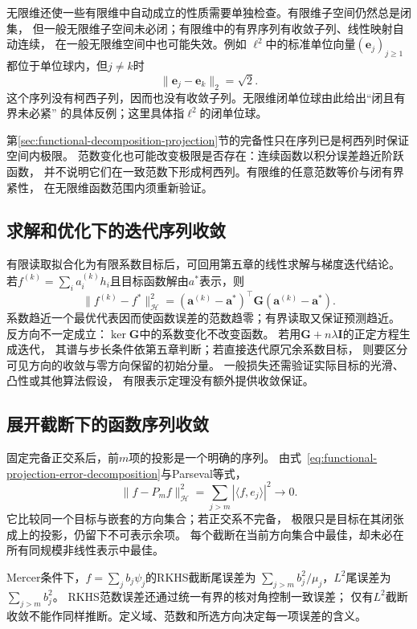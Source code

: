 无限维还使一些有限维中自动成立的性质需要单独检查。有限维子空间仍然总是闭集，
但一般无限维子空间未必闭；有限维中的有界序列有收敛子列、线性映射自动连续，
在一般无限维空间中也可能失效。例如
$\ell^2$中的标准单位向量$(\bm{e}_j)_{j\geq1}$都位于单位球内，但$j\neq k$时
\[
  \lVert\bm{e}_j-\bm{e}_k\rVert_2=\sqrt{2}.
\]
这个序列没有柯西子列，因而也没有收敛子列。无限维闭单位球由此给出“闭且有界未必紧”
的具体反例；这里具体指$\ell^2$的闭单位球。


第\ref{sec:functional-decomposition-projection}节的完备性只在序列已是柯西列时保证空间内极限。
范数变化也可能改变极限是否存在：连续函数以积分误差趋近阶跃函数，
并不说明它们在一致范数下形成柯西列。有限维的任意范数等价与闭有界紧性，
在无限维函数范围内须重新验证。

\subsection{求解和优化下的迭代序列收敛}
\label{sec:functional-iteration-convergence}

有限读取拟合化为有限系数目标后，可回用第五章的线性求解与梯度迭代结论。
若$f^{(k)}=\sum_i a_i^{(k)}h_i$且目标函数解由$a^*$表示，则
\[
 \lVert f^{(k)}-f^*\rVert_{\mathcal H}^2
 =(\bm a^{(k)}-\bm a^*)^\top\bm G(\bm a^{(k)}-\bm a^*).
\]
系数趋近一个最优代表因而使函数误差的范数趋零；有界读取又保证预测趋近。
反方向不一定成立：$\ker\bm G$中的系数变化不改变函数。
若用$\bm G+n\lambda\bm I$的正定方程生成迭代，
其谱与步长条件依第五章判断；若直接迭代原冗余系数目标，
则要区分可见方向的收敛与零方向保留的初始分量。
一般损失还需验证实际目标的光滑、凸性或其他算法假设，
有限表示定理没有额外提供收敛保证。

\subsection{展开截断下的函数序列收敛}
\label{sec:functional-truncation-convergence}

固定完备正交系后，前$m$项的投影是一个明确的序列。
由式~\eqref{eq:functional-projection-error-decomposition}与Parseval等式，
\[
 \lVert f-P_mf\rVert_{\mathcal H}^2
 =\sum_{j>m}|\langle f,e_j\rangle|^2\to0.
\]
它比较同一个目标与嵌套的方向集合；若正交系不完备，
极限只是目标在其闭张成上的投影，仍留下不可表示余项。
每个截断在当前方向集合中最佳，却未必在所有同规模非线性表示中最佳。

Mercer条件下，$f=\sum_j b_j\psi_j$的RKHS截断尾误差为
$\sum_{j>m}b_j^2/\mu_j$，$L^2$尾误差为$\sum_{j>m}b_j^2$。
RKHS范数误差还通过统一有界的核对角控制一致误差；
仅有$L^2$截断收敛不能作同样推断。定义域、范数和所选方向决定每一项误差的含义。

